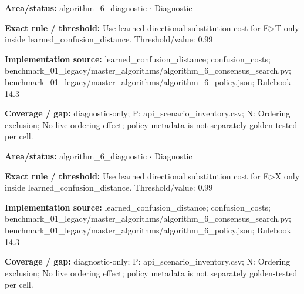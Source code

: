\begin{tcolorbox}[enhanced,breakable,colback=white,colframe=Muted!45,boxrule=0.45pt,arc=1.5pt,left=6pt,right=6pt,top=5pt,bottom=5pt,title={\texttt{A6-LEARNED-SUBSTITUTION-E-T}},title after break={\texttt{A6-LEARNED-SUBSTITUTION-E-T}\ (continued)},fonttitle=\headingfont\bfseries\color{Navy},coltitle=Navy]
\textbf{Area/status:} algorithm\_\allowbreak{}6\_\allowbreak{}diagnostic $\boldsymbol{\cdot}$ Diagnostic\par
\smallskip
\textbf{Exact rule / threshold:} Use learned directional substitution cost for E>T only inside learned\_\allowbreak{}confusion\_\allowbreak{}distance. Threshold/\allowbreak{}value: 0.99\par
\smallskip
\textbf{Implementation source:} learned\_\allowbreak{}confusion\_\allowbreak{}distance; confusion\_\allowbreak{}costs; benchmark\_\allowbreak{}01\_\allowbreak{}legacy/\allowbreak{}master\_\allowbreak{}algorithms/\allowbreak{}algorithm\_\allowbreak{}6\_\allowbreak{}consensus\_\allowbreak{}search.py; benchmark\_\allowbreak{}01\_\allowbreak{}legacy/\allowbreak{}master\_\allowbreak{}algorithms/\allowbreak{}algorithm\_\allowbreak{}6\_\allowbreak{}policy.json; Rulebook 14.3\par
\smallskip
\textbf{Coverage / gap:} diagnostic-only; P: api\_\allowbreak{}scenario\_\allowbreak{}inventory.csv; N: Ordering exclusion; No live ordering effect; policy metadata is not separately golden-tested per cell.
\end{tcolorbox}
\begin{tcolorbox}[enhanced,breakable,colback=white,colframe=Muted!45,boxrule=0.45pt,arc=1.5pt,left=6pt,right=6pt,top=5pt,bottom=5pt,title={\texttt{A6-LEARNED-SUBSTITUTION-E-X}},title after break={\texttt{A6-LEARNED-SUBSTITUTION-E-X}\ (continued)},fonttitle=\headingfont\bfseries\color{Navy},coltitle=Navy]
\textbf{Area/status:} algorithm\_\allowbreak{}6\_\allowbreak{}diagnostic $\boldsymbol{\cdot}$ Diagnostic\par
\smallskip
\textbf{Exact rule / threshold:} Use learned directional substitution cost for E>X only inside learned\_\allowbreak{}confusion\_\allowbreak{}distance. Threshold/\allowbreak{}value: 0.99\par
\smallskip
\textbf{Implementation source:} learned\_\allowbreak{}confusion\_\allowbreak{}distance; confusion\_\allowbreak{}costs; benchmark\_\allowbreak{}01\_\allowbreak{}legacy/\allowbreak{}master\_\allowbreak{}algorithms/\allowbreak{}algorithm\_\allowbreak{}6\_\allowbreak{}consensus\_\allowbreak{}search.py; benchmark\_\allowbreak{}01\_\allowbreak{}legacy/\allowbreak{}master\_\allowbreak{}algorithms/\allowbreak{}algorithm\_\allowbreak{}6\_\allowbreak{}policy.json; Rulebook 14.3\par
\smallskip
\textbf{Coverage / gap:} diagnostic-only; P: api\_\allowbreak{}scenario\_\allowbreak{}inventory.csv; N: Ordering exclusion; No live ordering effect; policy metadata is not separately golden-tested per cell.
\end{tcolorbox}
